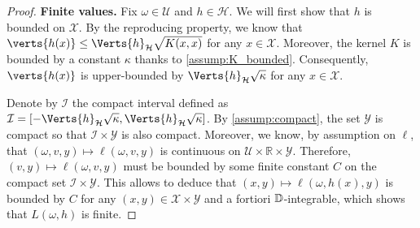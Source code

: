 \begin{proof}
	
	{\bf Finite values.} Fix $\omega\in \mathcal{U}$ and $h\in \mathcal{H}$. We will first show that  $h$ is bounded on $\mathcal{X}$. By the reproducing property, we know that $\verts{h(x)}\leq \Verts{h}_{\mathcal{H}}\sqrt{K(x,x)}$ for any $x\in \mathcal{X}$. Moreover, the kernel $K$ is bounded by a constant $\kappa$ thanks to \cref{assump:K_bounded}. Consequently, $\verts{h(x)}$ is upper-bounded by $\Verts{h}_{\mathcal{H}}\sqrt{\kappa}$ for any $x\in \mathcal{X}$. 
    
    Denote by $\mathcal{I}$ the compact interval defined as $ \mathcal{I}= [-\Verts{h}_{\mathcal{H}}\sqrt{\kappa},\Verts{h}_{\mathcal{H}}\sqrt{\kappa} ]$. By \cref{assump:compact}, the set $\mathcal{Y}$ is compact so that $\mathcal{I}\times\mathcal{Y}$ is also compact. 
    Moreover, we know, by assumption on  $\ell$, that $(\omega, v, y)\mapsto\ell(\omega, v, y)$ is continuous on $\mathcal{U}\times \mathbb{R}\times \mathcal{Y}$. 
    Therefore, $(v, y)\mapsto\ell(\omega, v, y)$  must be bounded by some finite constant $C$ on the compact set $\mathcal{I}\times \mathcal{Y}$. This allows to deduce that $(x, y)\mapsto\ell(\omega, h(x), y)$ is bounded by $C$ for any $(x,y)\in\mathcal{X}\times \mathcal{Y}$ and a fortiori $\mathbb{D}$-integrable, which shows that $L(\omega,h)$ is finite. 


\end{proof}
